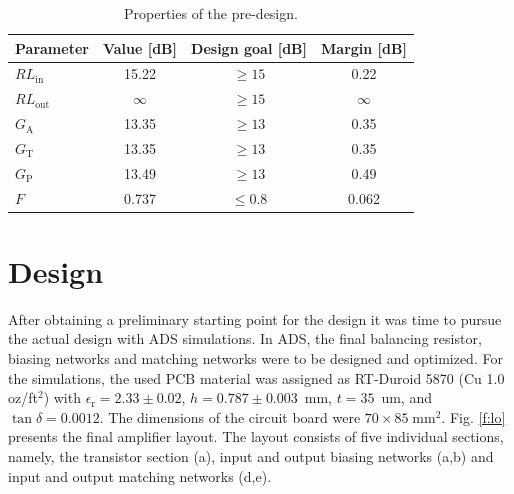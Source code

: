 \documentclass[a4paper, 12pt]{article}
\newlength{\oneLine}
\begin{document}
\begin{table}[!h]
	\begin{center}
		\caption{Properties of the pre-design.}
		\label{t:pre3}
		\renewcommand{\arraystretch}{1.2}
		\begin{tabular}{lccc}
			Parameter						&	Value [dB]	& Design goal [dB] 	& Margin [dB]	\\
			\hline
			$\mathit{RL}_\mathrm{in}$		&	15.22		& $\geq 15$ 		& 0.22			\\
			$\mathit{RL}_\mathrm{out}$		&	$\infty$	& $\geq 15$  		& $\infty$		\\
			$G_\mathrm{A}$					&	13.35		& $\geq 13$  		& 0.35			\\				
			$G_\mathrm{T}$					&	13.35		& $\geq 13$  		& 0.35			\\
			$G_\mathrm{P}$					&	13.49		& $\geq 13$  		& 0.49			\\
			$F$								&	0.737		& $\leq 0.8$ 		& 0.062				
		\end{tabular}
	\end{center}
	\vspace{-1\oneLine}
\end{table}

\newpage
\vspace*{0pt}
\newpage
\section{Design}
\label{s:design}

After obtaining a preliminary starting point for the design it was time to pursue 
the actual design with ADS simulations. In ADS, the final balancing resistor, 
biasing networks and matching networks were to be designed and optimized. For 
the simulations, the used PCB material was assigned as RT-Duroid 5870 (Cu 1.0 oz/ft$^2$) 
with $\epsilon_\mathrm{r} = 2.33 \pm 0.02$, $h = 0.787 \pm 0.003$~mm, $t = 35$~um, and $\tan \delta = 0.0012$. 
The dimensions of the circuit board were $70 \times 85 \; \mathrm{mm}^2$. Fig. \ref{f:lo} 
presents the final amplifier layout. The layout consists of five individual 
sections, namely, the transistor section (a), input and output biasing networks 
(a,b) and input and output matching networks (d,e). 
\end{document}
